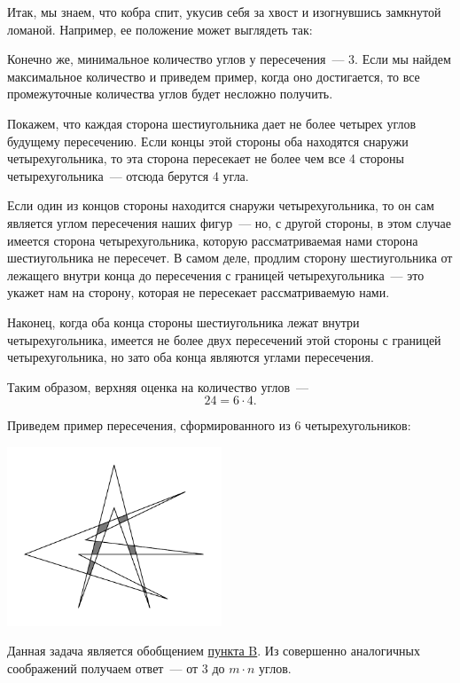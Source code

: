 ﻿

\begin{itemize}
\itA Итак, мы знаем, что кобра спит, укусив себя за хвост и изогнувшись замкнутой ломаной. Например, ее положение может выглядеть так:

\begin{center}  \end{center}

\itB \label{float-ptb} Конечно же, минимальное количество углов у пересечения~— 3. Если мы найдем максимальное количество и приведем пример, когда оно достигается, то все промежуточные количества углов будет несложно получить.

Покажем, что каждая сторона шестиугольника дает не более четырех углов будущему пересечению. Если концы этой стороны оба находятся снаружи четырехугольника, то эта сторона пересекает не более чем все 4 стороны четырехугольника~--- отсюда берутся 4 угла.

Если один из концов стороны находится снаружи четырехугольника, то он сам является углом пересечения наших фигур~--- но, с другой стороны, в этом случае имеется сторона четырехугольника, которую рассматриваемая нами сторона шестиугольника не пересечет. В самом деле, продлим сторону шестиугольника от лежащего внутри конца до пересечения с границей четырехугольника~--- это укажет нам на сторону, которая не пересекает рассматриваемую нами.

Наконец, когда оба конца стороны шестиугольника лежат внутри четырехугольника, имеется не более двух пересечений этой стороны с границей четырехугольника, но зато оба конца являются углами пересечения.

Таким образом, верхняя оценка на количество углов~—
	$$24 = 6 \cdot 4.$$

Приведем пример пересечения, сформированного из 6 четырехугольников:

\begin{center}
	\includegraphics[width=6.4cm]{figures/2017-8-3B}
\end{center}

\itC Данная задача является обобщением \hyperref[float-ptb]{пункта B}. Из совершенно аналогичных соображений получаем ответ~--- от 3 до $m \cdot n$ углов.

\end{itemize}
